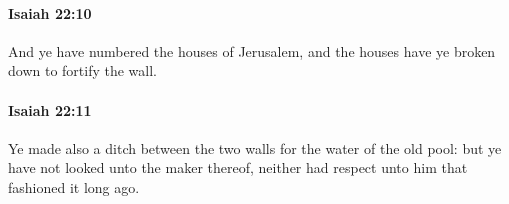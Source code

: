 		\paragraph{Isaiah 22:10} %
			\label{ISAIAH-22-10}

			And ye have numbered the houses of Jerusalem, and the houses have ye broken down to fortify the wall.


		\paragraph{Isaiah 22:11} %
			\label{ISAIAH-22-11}

			Ye made also a ditch between the two walls for the water of the old pool: but ye have not looked unto the maker thereof, neither had respect unto him that fashioned it long ago.


